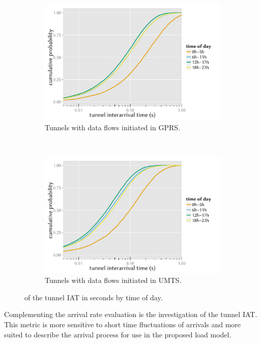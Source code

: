 \begin{figure}[htb]
	\begin{subfigure}[b]{0.5\textwidth}
		\includegraphics[width=\textwidth]{images/R-IAT-fromflows-gprs-ecdfs-2h.pdf}
		\caption{Tunnels with data flows initiated in \gls{GPRS}.}
		\label{c4:fig:IAT-ecdf-2h-active-gprs}
	\end{subfigure}%
	~
	\begin{subfigure}[b]{0.5\textwidth}
		\includegraphics[width=\textwidth]{images/R-IAT-fromflows-umts-ecdfs-2h.pdf}
		\caption{Tunnels with data flows initiated in \gls{UMTS}.}
		\label{c4:fig:IAT-ecdf-2h-active-umts}
	\end{subfigure}
	\caption{ of the tunnel \acrshort{IAT} in seconds by time of day.}
\label{c4:fig:IAT-ecdf-2h}
\end{figure}

Complementing the arrival rate evaluation is the investigation of the tunnel \gls{IAT}. This metric is more sensitive to short time fluctuations of arrivals and more suited to describe the arrival process for use in the proposed load model.

